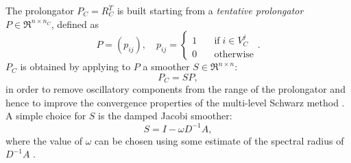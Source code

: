 The prolongator $P_C=R_C^T$ is built starting from a \emph{tentative prolongator}
$P \in \Re^{n \times n_C}$, defined as
\begin{equation} 
P=(p_{ij}), \quad  p_{ij}= 
\left\{ \begin{array}{ll}
1 & \quad \mbox{if} \; i \in V^j_C \\
0 & \quad \mbox{otherwise}
\end{array} \right. .
\label{eq:tent_prol}
\end{equation}
$P_C$ is obtained by
applying to $P$ a smoother $S \in \Re^{n \times n}$:
\begin{equation}
P_C = S P,
\label{eq:smoothed_prol}
\end{equation}
in order to remove oscillatory components from the range of the prolongator
and hence to improve the convergence properties of the multi-level
Schwarz method \cite{BREZINA_VANEK,Stuben_01}.
A simple choice for $S$ is the damped Jacobi smoother:
\begin{equation}
S = I - \omega D^{-1} A , 
\label{eq:jac_smoother}
\end{equation}
where the value of $\omega$ can be chosen
using some estimate of the spectral radius of $D^{-1}A$ \cite{BREZINA_VANEK}.
%
%

